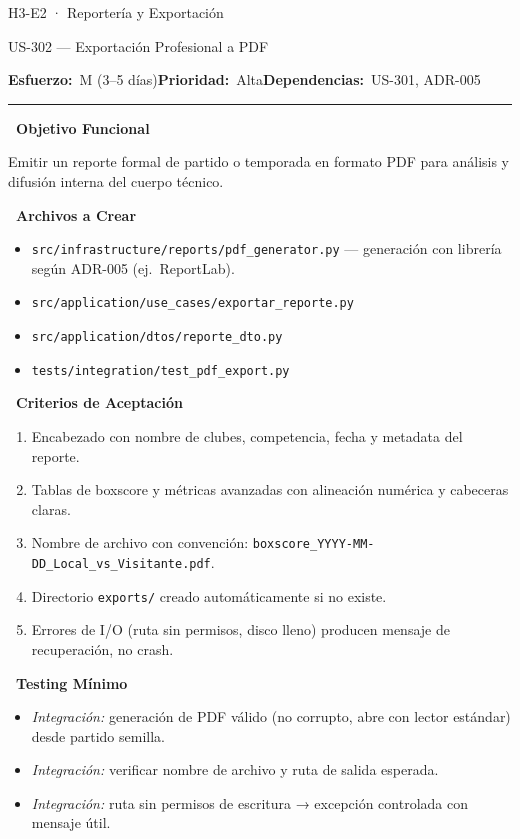 \documentclass[11pt,a4paper]{article}
\newcommand{\fpath}[1]{\texttt{\small #1}}
\newcommand{\usfield}[2][\;]{%
  \par\vspace{5pt}%
  {\small\textbf{\textcolor{primary}{#2}}}\par\vspace{2pt}%
}
\newcommand{\usmeta}[3]{%
  \vspace{2pt}%
  {\small\textcolor{secondary}{%
    \textbf{Esfuerzo:}~#1\quad\textbf{Prioridad:}~#2\quad\textbf{Dependencias:}~#3%
  }}%
  \par\vspace{4pt}%
  \textcolor{bordergray}{\rule{\linewidth}{0.4pt}}\par\vspace{4pt}%
}
\begin{document}
\begin{epicbox}{H3-E2 · Reportería y Exportación}
\end{epicbox}

\begin{uscard}{US-302 — Exportación Profesional a PDF}

\usmeta{M (3–5 días)}{Alta}{US-301, ADR-005}

\usfield{\faAlignLeft\ Objetivo Funcional}
Emitir un reporte formal de partido o temporada en formato PDF para análisis y difusión interna del cuerpo técnico.

\usfield{\faFolderOpen\ Archivos a Crear}
\begin{itemize}[nosep, leftmargin=1.6em]
  \item \fpath{src/infrastructure/reports/pdf\_generator.py} — generación con librería según ADR-005 (ej.\ ReportLab).
  \item \fpath{src/application/use\_cases/exportar\_reporte.py}
  \item \fpath{src/application/dtos/reporte\_dto.py}
  \item \fpath{tests/integration/test\_pdf\_export.py}
\end{itemize}

\usfield{\faCheckCircle\ Criterios de Aceptación}
\begin{enumerate}[label=\textcolor{accent}{\textbf{AC\arabic*.}}, nosep, leftmargin=2.2em]
  \item Encabezado con nombre de clubes, competencia, fecha y metadata del reporte.
  \item Tablas de boxscore y métricas avanzadas con alineación numérica y cabeceras claras.
  \item Nombre de archivo con convención: \fpath{boxscore\_YYYY-MM-DD\_Local\_vs\_Visitante.pdf}.
  \item Directorio \fpath{exports/} creado automáticamente si no existe.
  \item Errores de I/O (ruta sin permisos, disco lleno) producen mensaje de recuperación, no crash.
\end{enumerate}

\usfield{\faFlask\ Testing Mínimo}
\begin{itemize}[nosep, leftmargin=1.6em]
  \item \textit{Integración:} generación de PDF válido (no corrupto, abre con lector estándar) desde partido semilla.
  \item \textit{Integración:} verificar nombre de archivo y ruta de salida esperada.
  \item \textit{Integración:} ruta sin permisos de escritura → excepción controlada con mensaje útil.
\end{itemize}

\end{uscard}
\end{document}
